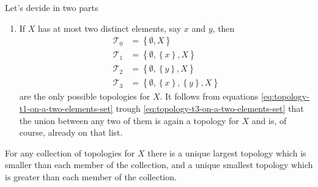 \begin{solution}
  Let's devide in two parts
  \begin{enumerate}
    \item
      If \(X\) has at most two distinct elements, say \(x\) and \(y\),
      then
      \begin{align}
        \label{eq:topology-t0-on-a-two-elements-set}
        \mathcal{T}_{0}&=\left\{\emptyset,X\right\}\\
        \label{eq:topology-t1-on-a-two-elements-set}
        \mathcal{T}_{1}&=\left\{\emptyset,\left\{x\right\},X\right\}\\
        \label{eq:topology-t2-on-a-two-elements-set}
        \mathcal{T}_{2}&=\left\{\emptyset,\left\{y\right\},X\right\}\\
        \label{eq:topology-t3-on-a-two-elements-set}
        \mathcal{T}_{3}&=\left\{\emptyset,\left\{x\right\},\left\{y\right\},X\right\}
      \end{align}
      are the only possible topologies for \(X\). It follows from equations
      \eqref{eq:topology-t1-on-a-two-elements-set} trough
      \eqref{eq:topology-t3-on-a-two-elements-set} that the union between any
      two of them is again a topology for \(X\) and is, of course, already on
      that list.
  \end{enumerate}
\end{solution}

\begin{problem}
  For any collection of topologies for \(X\) there is a unique largest topology
  which is smaller than each member of the collection, and a unique smallest
  topology which is greater than each member of the collection.
\end{problem}
